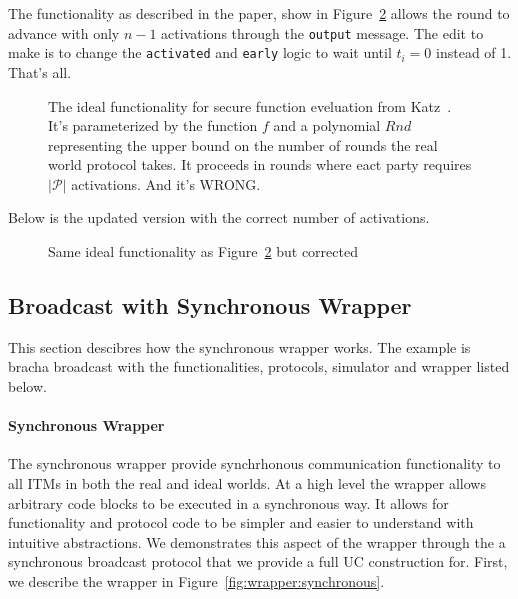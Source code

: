 The functionality as described in the paper, show in Figure~\ref{fig:sfe} allows the round to advance with only $n-1$ activations through the \texttt{output} message.
The edit to make is to change the \texttt{activated} and \texttt{early} logic to wait until $t_i = 0$ instead of 1. That's all.


\begin{figure}
	
	\label{fig:sfe}
	\caption{The ideal functionality for secure function eveluation from Katz~\cite{synchronousuc}. It's parameterized by the function $f$ and a polynomial $Rnd$ representing the upper bound on the number of rounds the real world protocol takes. It proceeds in rounds where eact party requires $|\mathcal{P}|$ activations. And it's WRONG.}
\end{figure}

Below is the updated version with the correct number of activations.

\begin{figure}
	
	\label{fig:sfe}
	\caption{Same ideal functionality as Figure~\ref{fig:sfe} but corrected}
\end{figure}

\begin{figure}
	
	\label{fig:wrapper}
\end{figure}

\newpage

\subsection{Broadcast with Synchronous Wrapper}
This section descibres how the synchronous wrapper works.
The example is bracha broadcast with the functionalities, protocols, simulator and wrapper listed below.

\paragraph{Synchronous Wrapper}
The synchronous wrapper provide synchrhonous communication functionality to all ITMs in both the real and ideal worlds.
At a high level the wrapper allows arbitrary code blocks to be executed in a synchronous way.
It allows for functionality and protocol code to be simpler and easier to understand with intuitive abstractions. 
We demonstrates this aspect of the wrapper through the a synchronous broadcast protocol that we provide a full UC construction for.
First, we describe the wrapper in Figure~\ref{fig:wrapper:synchronous}.

